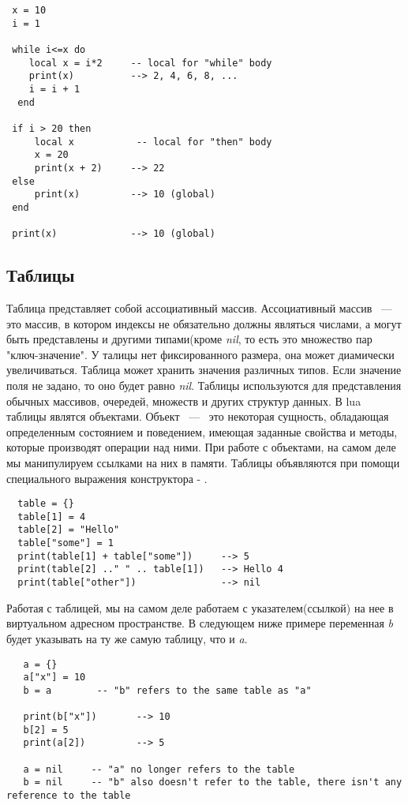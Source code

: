 \begin{lstlisting}
 x = 10
 i = 1  
    
 while i<=x do
    local x = i*2     -- local for "while" body
    print(x)          --> 2, 4, 6, 8, ...
    i = i + 1
  end
  
 if i > 20 then
     local x           -- local for "then" body
     x = 20
     print(x + 2)	  --> 22
 else
     print(x)         --> 10 (global)
 end
    
 print(x)             --> 10 (global)
\end{lstlisting}

\subsection{Таблицы}

Таблица представляет собой ассоциативный массив. Ассоциативный массив ~---~ это массив, в котором индексы не обязательно должны являться числами, а могут быть представлены и другими типами(кроме \emph{nil}, то есть это множество пар "ключ-значение". У талицы нет фиксированного размера, она может диамически увеличиваться. Таблица может хранить значения различных типов. Если значение поля не задано, то оно будет равно \emph{nil}. Таблицы используются для представления обычных массивов, очередей, множеств и других структур данных. В lua таблицы являтся объектами. Объект ~---~ это некоторая сущность, обладающая определенным состоянием и поведением, имеющая заданные свойства и методы, которые производят операции над ними. При работе с объектами, на самом деле мы манипулируем ссылками на них в памяти. Таблицы объявляются при помощи специального выражения  конструктора - {}. 

\begin{lstlisting}
  table = {}
  table[1] = 4
  table[2] = "Hello"
  table["some"] = 1
  print(table[1] + table["some"])     --> 5
  print(table[2] .." " .. table[1])   --> Hello 4
  print(table["other"])               --> nil
\end{lstlisting}

Работая с таблицей, мы на самом деле работаем с указателем(ссылкой) на нее в виртуальном адресном пространстве.
В следующем ниже примере переменная \emph{b} будет указывать на ту же самую таблицу, что и \emph{a}.
\begin{lstlisting}
   a = {}
   a["x"] = 10
   b = a   		-- "b" refers to the same table as "a"  

   print(b["x"])       --> 10
   b[2] = 5
   print(a[2]) 		   --> 5
   
   a = nil     -- "a" no longer refers to the table
   b = nil     -- "b" also doesn't refer to the table, there isn't any reference to the table 

\end{lstlisting} 

